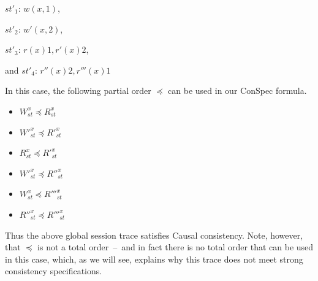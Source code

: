 \documentclass[journal, compsoc]{IEEEtran}
\begin{document}
	$\mathit{st}'_1$: $w(x,1)$,
	
	$\mathit{st}'_2$: $w'(x,2)$,
	
	$\mathit{st}'_3$: $r(x){1}, r'(x){2}$,
	
	and  $\mathit{st}'_4$: $r''(x){2}, r'''(x){1}$
	
	In this case, the following partial order  $\preccurlyeq$ can be used in our ConSpec formula.
	
	\begin{itemize}
		
		\item $W^x_{\mathit{st}}   \preccurlyeq R^x_{\mathit{st}} $  
		\item $W'^x_{\mathit{st}}  \preccurlyeq R'^x_{\mathit{st}} $
		\item $R^x_{\mathit{st}} \preccurlyeq R'^x_{\mathit{st}} $
		
		\item $W'^x_{\mathit{st}}   \preccurlyeq R''^x_{\mathit{st}} $  
		\item $W^x_{\mathit{st}}  \preccurlyeq R'''^x_{\mathit{st}} $
		\item $R''^x_{\mathit{st}} \preccurlyeq R'''^x_{\mathit{st}} $
		
		
		
	\end{itemize}
	
	\noindent Thus the above  global session trace satisfies Causal consistency. Note, however, that $\preccurlyeq$ is not a total order~--~and in fact there is no total order that can be used in this case, which, as we will see, explains why this trace does not meet strong consistency specifications.
	
\end{document}
